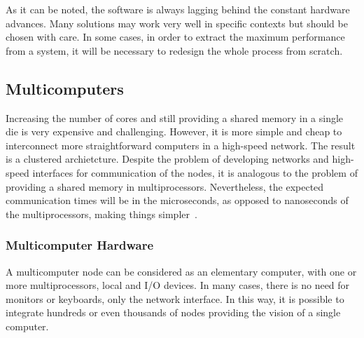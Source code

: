 			As it can be noted, the software is always lagging behind the constant hardware advances.
			Many solutions may work very well in specific contexts but should be chosen with care.
			In some cases, in order to extract the maximum performance from a system, it will be
			necessary to redesign the whole process from scratch.

	\subsection{Multicomputers}
	\label{sec.multicomputers}

		Increasing the number of cores and still providing a shared memory in a
		single die is very expensive and challenging.
		However, it is more simple and cheap to interconnect more straightforward
		computers in a high-speed network. The result is a clustered archietcture.
		Despite the problem of developing networks and high-speed interfaces
		for communication of the nodes, it is analogous to the problem of
		providing a shared memory in multiprocessors.
		Nevertheless, the expected communication times will be in the
		microseconds, as opposed to nanoseconds of the multiprocessors,
		making things simpler~\cite{tanenbaum:4ed}.

			\subsubsection{Multicomputer Hardware}
			\label{sec.multicomputers-hw}

				A multicomputer node can be considered as an elementary computer, with one or
				more multiprocessors, local \ram and I/O devices.
				In many cases, there is no need for monitors or keyboards, only the
				network interface.
				In this way, it is possible to integrate hundreds or even thousands
				of nodes providing the vision of a single computer.

